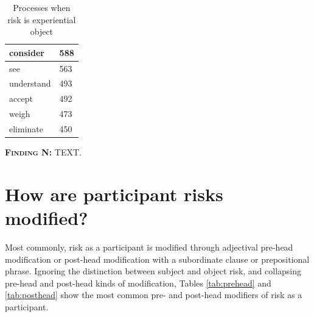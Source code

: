 \begin{table}[htb!]
{\begin{minipage}{.35\textwidth}
\begin{tabularx}{1.0\textwidth}{|>{\raggedright}X|l|}
										consider                                         & 588   \\ \hline
										see                                              & 563   \\ \hline
										understand                                       & 493   \\ \hline
										accept                                           & 492   \\ \hline
										weigh & 473   \\ \hline
										eliminate & 450   \\ \hline
			
										\end{tabularx}
										\caption{Processes when risk is experiential object}
										\label{tab:obj}
										\end{minipage}}
										\end{table}

  \noindent\colorbox{yellow!20}{%
  \parbox{1\textwidth}{%
  \textsc{\textbf{Finding N:}} TEXT.}}


	\section{How are participant risks modified?}
	\FloatBarrier

				Most commonly, risk as a participant is modified through adjectival pre-head modification or post-head modification with a subordinate clause or prepositional phrase. Ignoring the distinction between subject and object risk, and collapsing pre-head and post-head kinds of modification, Tables \ref{tab:prehead} and \ref{tab:posthead} show the most common pre- and post-head modifiers of risk as a participant.

